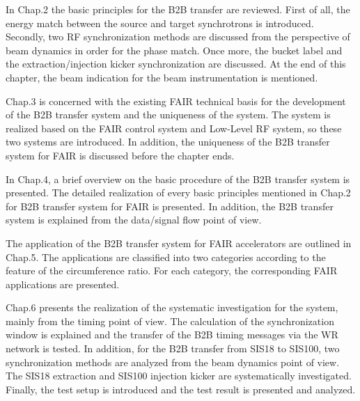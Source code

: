 In Chap.2 the basic principles for the B2B transfer are reviewed. First of all, the energy match between the source and target synchrotrons is introduced. Secondly, two RF synchronization methods are discussed from the perspective of beam dynamics in order for the phase match. Once more, the bucket label and the extraction/injection kicker synchronization are discussed. At the end of this chapter, the beam indication for the beam instrumentation is mentioned.

Chap.3 is concerned with the existing FAIR technical basis for the development of the B2B transfer system and the uniqueness of the system. The system is realized based on the FAIR control system and Low-Level RF system, so these two systems are introduced. In addition, the uniqueness of the B2B transfer system for FAIR is discussed before the chapter ends. 

In Chap.4, a brief overview on the basic procedure of the B2B transfer system is presented. The detailed realization of every basic principles mentioned in Chap.2 for B2B transfer system for FAIR is presented. In addition, the B2B transfer system is explained from the data/signal flow point of view.

The application of the B2B transfer system for FAIR accelerators are outlined in Chap.5. The applications are classified into two categories according to the feature of the circumference ratio. For each category, the corresponding FAIR applications are presented. 

Chap.6 presents the realization of the systematic investigation for the system, mainly from the timing point of view. The calculation of the synchronization window is explained and the transfer of the B2B timing messages via the WR network is tested. In addition, for the B2B transfer from SIS18 to SIS100, two synchronization methods are analyzed from the beam dynamics point of view. The SIS18 extraction and SIS100 injection kicker are systematically investigated. Finally, the test setup is introduced and the test result is presented and analyzed.

%
%
